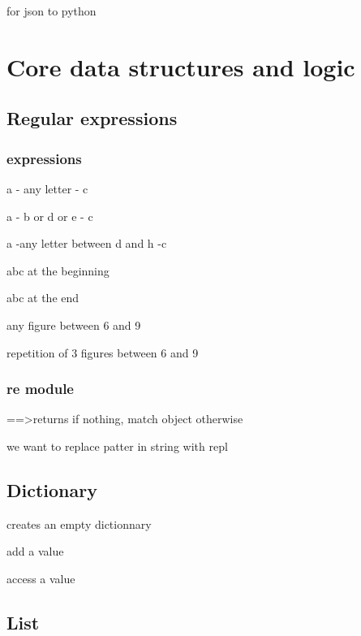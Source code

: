 			 for json to python



\section{Core data structures and logic}


	\subsection{Regular expressions}

		\subsubsection{expressions}


			 a - any  letter  - c

			 a - b or d or e - c

			 a -any letter between d and h -c

			 abc at the beginning

			 abc at the end

			\code{[6-9]} any figure between 6 and 9

			 repetition of 3 figures between 6 and 9


			\subsubsection{re module}
			

				 ==>returns  if nothing, match object otherwise

				 we want to replace patter in string with repl



	\subsection{Dictionary}

		 creates an empty dictionnary

		 add a value

		 access a value

	\subsection{List}

